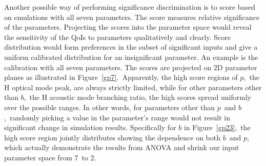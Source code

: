 \documentclass[review]{elsarticle}
\begin{document}
Another possible way of performing significance discrimination is to score based on emulations with all seven parameters. The score measures relative significance of the parameters. Projecting the scores into the parameter space would reveal the sensitivity of the QoIs to parameters qualitatively and clearly. Score distribution would form preferences in the subset of significant inputs and give a uniform calibrated distribution for an insignificant parameter. An example is the calibration with all seven parameters. The scores are projected on 2D parameter planes as illustrated in Figure~\ref{gp7}.~Apparently, the high score regions of $p$,~the H optical mode peak, are always strictly limited, while for other parameters other than $b$,~the H acoustic mode branching ratio, the high scores spread uniformly over the possible ranges. In other words, for parameters other than $p$~and $b$,~randomly picking a value in the parameter's range would not result in significant change in simulation results. Specifically for $b$ in Figure~\ref{gp23},~the high score region jointly distributes showing the dependence on both $b$~and $p$, which actually demonstrate the results from ANOVA and shrink our input parameter space from 7~to 2.
\end{document}
